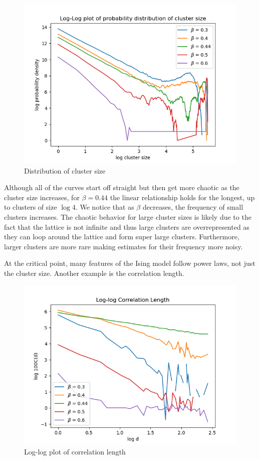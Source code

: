 \documentclass{article}
\begin{document}
\begin{figure}[ht]
    \includegraphics[width=\columnwidth]{plots/cluster_size.png}
    \caption{Distribution of cluster size}
    \label{fig:6}
\end{figure}

Although all of the curves start off straight but then get more chaotic as the cluster size increases, for $\beta = 0.44$
the linear relationship holds for the longest, up to clusters of size $\log 4$. We notice that as $\beta$ decreases, 
the frequency of small clusters increases. The chaotic behavior for large cluster sizes is likely due to the fact that the lattice
is not infinite and thus large clusters are overrepresented as they can loop around the lattice and form super large clusters. 
Furthermore, larger clusters are more rare making estimates for their frequency more noisy. 

At the critical point, many features of the Ising model follow power laws, not just the cluster size. Another example is
the correlation length. 

\begin{figure}[ht]
    \includegraphics[width=\columnwidth]{plots/log_log_corr_len.png}
    \caption{Log-log plot of correlation length}
    \label{fig:6}
\end{figure}
\end{document}
